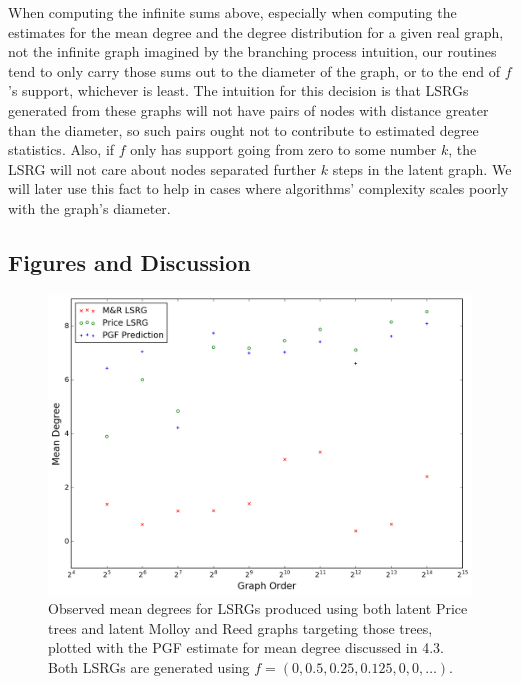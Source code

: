 \documentclass[12pt]{article}
\begin{document}
When computing the infinite sums above, especially when computing the estimates for the mean degree
and the degree distribution for a given real graph, not the infinite graph imagined by the branching
process intuition, our routines tend to only carry those sums out to the diameter of the graph, or to
the end of $f$'s support, whichever is least. The intuition for this decision is that LSRGs generated
from these graphs will not have pairs of nodes with distance greater than the diameter, so such pairs
ought not to contribute to estimated degree statistics. Also, if $f$ only has support going from zero to
some number $k$, the LSRG will not care about nodes separated further $k$ steps in the latent graph. We will
later use this fact to help in cases where algorithms' complexity scales poorly with the graph's diameter.\par

\subsection{\textbf{\textsf{Figures and Discussion}}}

\begin{figure}[h!]
\begin{center}
\includegraphics[width=350pt]{5}
\caption{Observed mean degrees for LSRGs produced using both latent Price trees and latent Molloy and
Reed graphs targeting those trees, plotted with the PGF estimate for mean degree discussed in 4.3.
Both LSRGs are generated using $f=(0, 0.5, 0.25, 0.125, 0, 0, \dotsc)$.}
\end{center}
\end{figure}
\end{document}
